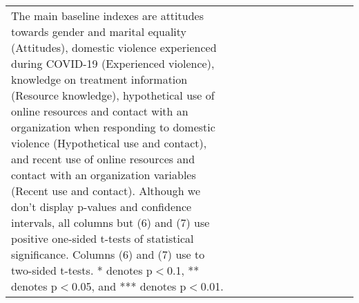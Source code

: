 \begin{table}[H]
\begin{tabular}{@{\extracolsep{0pt}}lccccccccccc}
{{The main baseline indexes are attitudes towards gender and marital equality (Attitudes), 
domestic violence experienced during COVID-19 (Experienced violence), 
knowledge on treatment information (Resource knowledge), 
hypothetical use of online resources and contact with an organization when responding to domestic violence (Hypothetical use and contact), 
and recent use of online resources and contact with an organization variables (Recent use and contact). 
Although we don't display p-values and confidence intervals, all columns but (6) and (7) use positive one-sided t-tests of statistical significance. Columns (6) and (7) use to two-sided t-tests. 
* denotes p$<$0.1, ** denotes p$<$0.05, and *** denotes p$<$0.01.}} \\\end{tabular} \end{table} 
